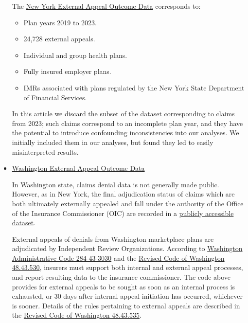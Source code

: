 \documentclass[12pt, a4paper,twoside,parskip=full]{report}
\theoremstyle{plain} %
\theoremstyle{definition} %
\theoremstyle{remark} %
\numberwithin{equation}{chapter}
\begin{document}
\begin{itemize}
\begin{tcolorbox}
			The \href{https://www.dfs.ny.gov/public-appeal/search}{New York External Appeal Outcome Data} corresponds to:
			
			\begin{itemize}
				\item Plan years 2019 to 2023.
				\item 24,728 external appeals.
				\item Individual and group health plans.
				\item Fully insured employer plans.
				\item IMRs associated with plans regulated by the New York State Department of Financial Services.
				
			\end{itemize}
		
			In this article we discard the subset of the dataset corresponding to claims from 2023; such claims correspond to an incomplete plan year, and they have the potential to introduce confounding inconsistencies into our analyses. We initially included them in our analyses, but found they led to easily misinterpreted results.
		
			\end{tcolorbox}
			
			\item \href{https://fortress.wa.gov/oic/consumertoolkit/Search.aspx?searchtype=indrev}{Washington External Appeal Outcome Data}\\
			
			\begin{tcolorbox}
				
			In Washington state, claims denial data is not generally made public. However, as in New York, the final adjudication status of claims which are both ultimately externally appealed and fall under the authority of the Office of the Insurance Commissioner (OIC) are recorded in a \href{https://fortress.wa.gov/oic/consumertoolkit/Search.aspx?searchtype=indrev}{publicly accessible dataset}.
			
			External appeals of denials from Washington marketplace plans are adjudicated by Independent Review Organizations. According to \href{https://apps.leg.wa.gov/wac/default.aspx?cite=284-43-3030}{Washington Administrative Code 284-43-3030} and the \href{https://app.leg.wa.gov/RCW/default.aspx?cite=48.43.530}{Revised Code of Washington 48.43.530}, insurers must support both internal and external appeal processes, and report resulting data to the insurance commissioner. The code above provides for external appeals to be sought as soon as an internal process is exhausted, or 30 days after internal appeal initiation has occurred, whichever is sooner. Details of the rules pertaining to external appeals are described in the \href{https://app.leg.wa.gov/rcw/default.aspx?cite=48.43.535}{Revised Code of Washington 48.43.535}.
			

\end{tcolorbox}
\end{itemize}
\end{document}
